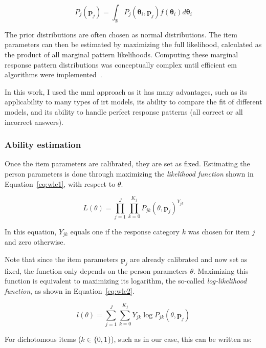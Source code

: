 \begin{equation}
    \label{eq:integrate-out}
    P_{j}(\bm{p}_j) = \int_{\mathbb{R}} P_{j}(\bm{\theta}_i,\bm{p}_j) f(\bm{\theta}_i) d\bm{\theta}_i
\end{equation}

The prior distributions are often chosen as normal distributions.
The item parameters can then be estimated by maximizing the full likelihood, calculated as the product of all marginal pattern likelihoods.
Computing these marginal response pattern distributions was conceptually complex until efficient \gls{em} algorithms were implemented~\cite{magis2017computerized}.

In this work, I used the \gls{mml} approach as it has many advantages, such as its applicability to many types of \gls{irt} models, its ability to compare the fit of different models, and its ability to handle perfect response patterns (all correct or all incorrect answers).

\subsubsection{Ability estimation}
Once the item parameters are calibrated, they are set as fixed.
Estimating the person parameters is done through maximizing the \textit{likelihood function} shown in Equation~\ref{eq:wle1}, with respect to $\theta$. 

\begin{equation}
    \label{eq:wle1}
    L(\theta) = \prod_{j=1}^{J} \prod_{k=0}^{K_j} P_{jk}(\theta, \bm{p}_j)^{Y_{jk}}
\end{equation}

In this equation, $Y_{jk}$ equals one if the response category $k$ was chosen for item $j$ and zero otherwise.

Note that since the item parameters $\bm{p}_j$ are already calibrated and now set as fixed, the function only depends on the person parameters $\theta$.
Maximizing this function is equivalent to maximizing its logarithm, the so-called \textit{log-likelihood function}, as shown in Equation~\ref{eq:wle2}.

\begin{equation}
    \label{eq:wle2}
    l(\theta) = \sum_{j=1}^{J} \sum_{k=0}^{K_j} Y_{jk}\log P_{jk}(\theta, \bm{p}_j)
\end{equation}

For dichotomous items ($k \in \{0,1\}$), such as in our case, this can be written as:

